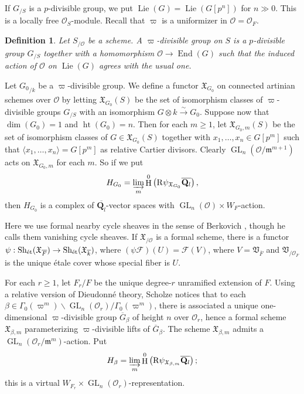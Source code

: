 \documentclass{article}
\DeclareMathOperator{\End}{End}
\DeclareMathOperator{\GL}{GL}
\DeclareMathOperator{\h}{H}
\DeclareMathOperator{\height}{ht}
\DeclareMathOperator{\lie}{Lie}
\DeclareMathOperator{\sheaves}{Sh}
\newcommand{\etale}{\textnormal{\'et}}
\newcommand{\iso}{\xrightarrow\sim}
\newcommand{\cO}{\mathcal{O}}
\newcommand{\dQ}{\mathbf{Q}}
\newcommand{\eR}{\mathrm{R}}
\newcommand{\fm}{\mathfrak{m}}
\newcommand{\fV}{\mathfrak{V}}
\newcommand{\fX}{\mathfrak{X}}
\newcommand{\sF}{\mathscr{F}}
\newcommand{\sO}{\mathscr{O}}
\newtheorem{definition}[subsection]{Definition}
\begin{document}
If $G_{/S}$ is a $p$-divisible group, we put $\lie(G)=\lie(G[p^n])$ for 
$n\gg 0$. This is a locally free $\sO_S$-module. Recall that $\varpi$ is a 
uniformizer in $\cO=\cO_F$. 

\begin{definition}
Let $S_{/\cO}$ be a scheme. A \emph{$\varpi$-divisible group} on $S$ is a 
$p$-divisible group $G_{/S}$ together with a homomorphism 
$\cO\to \End(G)$ such that the induced action of $\cO$ on $\lie(G)$ agrees 
with the usual one. 
\end{definition}

Let ${G_0}_{/k}$ be a $\varpi$-divisible group. We define a functor 
$\fX_{G_0}$ on connected artinian schemes over $\cO$ by letting 
$\fX_{G_0}(S)$ be the set of isomorphism classes of $\varpi$-divisible 
groups $G_{/S}$ with an isomorphism $G\otimes k\iso G_0$. Suppose now that 
$\dim(G_0)=1$ and $\height(G_0)=n$. Then for each 
$m\geqslant 1$, let $\fX_{G_0,m}(S)$ be the set of isomorphism classes of 
$G\in \fX_{G_0}(S)$ together with $x_1,\dots,x_n\in G[p^m]$ such that 
$\langle x_1,\dots,x_n\rangle = G[p^m]$ as relative Cartier divisors. 
Clearly $\GL_n(\cO/\fm^{m+1})$ acts on $\fX_{G_0,m}$ for each $m$. So if 
we put 
\[
  H_{G_0} = \varinjlim_m \h^0\left(\eR \psi_{\fX_{G_0}}\overline{\dQ_l}\right) ,
\]
then $H_{G_0}$ is a complex of $\overline{\dQ_l}$-vector spaces with 
$\GL_n(\cO)\times W_F$-action. 

Here we use formal nearby cycle sheaves in the sense of Berkovich 
\cite{berkovich-1996}, though he calls them vanishing cycle sheaves. If 
$\fX_{/\cO}$ is a formal scheme, there is a functor 
$\psi:\sheaves_\etale(\fX_{\overline F}) \to \sheaves_\etale(\fX_{\overline k})$, 
where $(\psi \sF)(U)=\sF(V)$, where $V=\fV_{\overline F}$ and 
$\fV_{/\cO_{\overline F}}$ is the unique \'etale cover whose special fiber is 
$U$. 

For each $r\geqslant 1$, let $F_r/F$ be the unique degree-$r$ unramified 
extension of $F$. Using a relative version of Dieudonn\'e theory, Scholze 
notices that to each 
$\beta\in \Gamma_0(\varpi^m)\backslash \GL_n(\cO_r)/\Gamma_0(\varpi^m)$, 
there is associated a unique one-dimensional $\varpi$-divisible group 
$\overline G_\beta$ of height $n$ over $\cO_r$, 
hence a formal scheme $\fX_{\beta,m}$ parameterizing $\varpi$-divisible 
lifts of $\overline G_\beta$. The scheme $\fX_{\beta,m}$ admits a 
$\GL_n(\cO_r/\fm^m)$-action. Put 
\[
  H_\beta = \varinjlim_m \h^0\left(\eR \psi_{\fX_{\beta,m}} \overline{\dQ_l}\right) ;
\]
this is a virtual $ W_{F_r}\times\GL_n(\cO_r)$-representation. 
\end{document}
